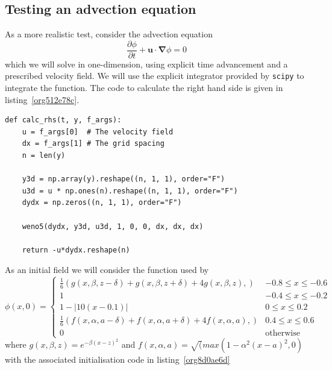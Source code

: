 \documentclass[11pt]{article}
\begin{document}
\pagebreak

\subsection{Testing an advection equation}
\label{sec:orga77be55}

As a more realistic test, consider the advection equation
\begin{equation}
  \frac{\partial\phi}{\partial t} + \boldsymbol{u}\cdot\boldsymbol{\nabla}\phi = 0
\end{equation}
which we will solve in one-dimension, using explicit time advancement and a prescribed velocity
field.
We will use the explicit integrator provided by \texttt{scipy} to integrate the function.
The code to calculate the right hand side is given in listing~\ref{org512e78c}.

\begin{lstlisting}
def calc_rhs(t, y, f_args):
    u = f_args[0]  # The velocity field
    dx = f_args[1] # The grid spacing
    n = len(y)

    y3d = np.array(y).reshape((n, 1, 1), order="F")
    u3d = u * np.ones(n).reshape((n, 1, 1), order="F")
    dydx = np.zeros((n, 1, 1), order="F")

    weno5(dydx, y3d, u3d, 1, 0, 0, dx, dx, dx)

    return -u*dydx.reshape(n)

\end{lstlisting}

As an initial field we will consider the function used by \cite{Jiang1996}
\begin{equation}
  \phi \left( x, 0 \right) =
  \begin{cases}
    \frac{1}{6} \left( g \left(x, \beta, z - \delta \right) + g\left(x, \beta, z + \delta \right) +
      4g \left(x, \beta, z \right), \right) & -0.8\leq x \leq-0.6 \\
    1 & -0.4 \leq x \leq -0.2 \\
    1 - \left|10\left(x-0.1\right)\right| & 0 \leq x \leq 0.2\\
    \frac{1}{6} \left( f \left(x, \alpha, a - \delta \right) + f\left(x, \alpha, a + \delta \right) +
      4f \left(x, \alpha, a \right), \right) & 0.4\leq x \leq 0.6 \\
    0 & \mbox{otherwise}
  \end{cases}
\end{equation}
where \(g\left(x,\beta,z\right)=e^{-\beta\left(x-z\right)^2}\) and
\(f\left(x,\alpha,a\right)=\sqrt(max\left(1 - \alpha^{2}\left(x-a\right)^{2}, 0\right)\) with the associated
initialisation code in listing~\ref{org8d0ae6d}
\end{document}
